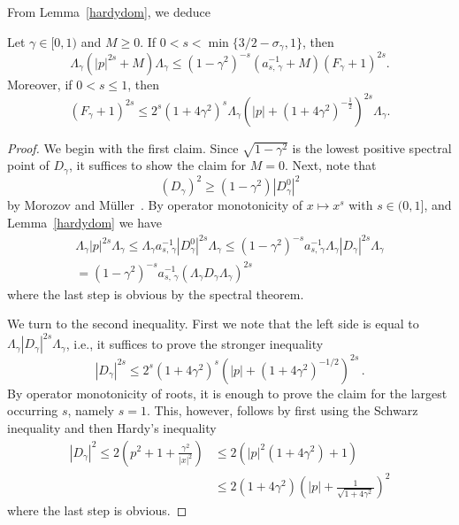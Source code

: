 \documentclass[AHL,Unicode,longabstracts,published]{cedram}
\begin{document}
From Lemma~\ref{hardydom}, we deduce

\begin{coro}\label{hardydomcor}
Let $\gamma\in[0,1)$ and $M\geq0$. If $0<s<\min\{3/2-\sigma_\gamma,1\}$, then
\begin{equation}\label{eq:hardydomcorform}
\Lambda_\gamma \left(|p|^{2s}+M\right)\Lambda_\gamma
\leq \left(1-\gamma^2\right)^{-s}\left(a_{s,\,\gamma}^{-1}+M\right) \left(F_\gamma+1\right)^{2s}.
\end{equation}
Moreover, if $0<s\leq1$, then
\[
\left(F_\gamma+1\right)^{2s}
\leq 2^s\left(1+4\gamma^2\right)^s \Lambda_\gamma\left(|p|+\left(1+4\gamma^2\right)^{-\frac12} \right)^{2s}\Lambda_\gamma.
\]
\end{coro}

\begin{proof}
We begin with the first claim. Since $\sqrt{1-\gamma^2}$ is the lowest positive spectral point of $D_\gamma$, it suffices to show the claim for $M=0$. Next, note that
\[
\left(D_\gamma\right)^2 \geq \left(1-\gamma^2\right) \left|D_\gamma^0\right|^2
\]
by Morozov and M\"uller~\cite[Proof of Corollary~I.2]{MorozovMuller2017}. By operator monotonicity of $x\mapsto x^s$ with $s\in(0,1]$, and Lemma~\ref{hardydom} we have
\begin{multline*}
\Lambda_\gamma|p|^{2s}\Lambda_\gamma \leq \Lambda_\gamma a_{s,\,\gamma}^{-1}\left|D_\gamma^0\right|^{2s}\Lambda_\gamma
\leq \left(1-\gamma^2\right)^{-s}a_{s,\,\gamma}^{-1}\Lambda_\gamma\left|D_\gamma\right|^{2s}\Lambda_\gamma\\
 = \left(1-\gamma^2\right)^{-s}a_{s,\,\gamma}^{-1}\left(\Lambda_\gamma D_\gamma\Lambda_\gamma\right)^{2s}
\end{multline*}
where the last step is obvious by the spectral theorem.

We turn to the second inequality. First we note that the left side is equal to $\Lambda_\gamma |D_\gamma|^{2s}\Lambda_\gamma$, i.e., it suffices to prove the stronger inequality
\[
\left|D_\gamma\right|^{2s}\leq 2^s\left(1+4\gamma^2\right)^s\left(|p|+\left(1+4\gamma^2\right)^{-1/2}\right)^{2s}\,.
\]
By operator monotonicity of roots, it is enough to prove the claim for the largest occurring $s$, namely $s=1$. This, however, follows by first using the Schwarz inequality and then Hardy's inequality
\begin{align*}
\left|D_\gamma\right|^2 \leq 2\left(p^2+1+\frac{\gamma^2}{|x|^2}\right)
&\leq 2 \left(|p|^2\left(1+4\gamma^2\right)+1\right)\\ &\leq 2\left(1+4\gamma^2\right)\left(|p|+\frac{1}{\sqrt{1+4\gamma^2}}\right)^2
\end{align*}
where the last step is obvious.
\end{proof}
\end{document}
